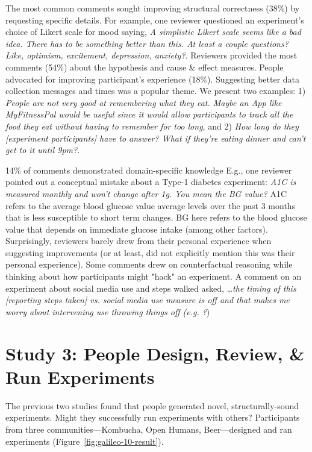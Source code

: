 The most common comments sought improving structural correctness (38\%) by requesting specific details. For example, one reviewer questioned an experiment's choice of Likert scale for mood saying, \textit{A simplistic Likert scale seems like a bad idea. There has to be something better than this. At least a couple questions? Like, optimism, excitement, depression, anxiety?}. Reviewers provided the most comments (54\%) about the hypothesis and cause \& effect measures. People advocated for improving participant's experience (18\%). Suggesting better data collection messages and times was a popular theme. We present two examples: 1) \textit{People are not very good at remembering what they eat. Maybe an App like MyFitnessPal would be useful since it would allow participants to track all the food they eat without having to remember for too long}, and 2) \textit{How long do they [experiment participants] have to answer? What if they're eating dinner and can't get to it until 9pm?}.

14\% of comments demonstrated domain-specific knowledge E.g., one reviewer pointed out a conceptual mistake about a Type-1 diabetes experiment: \textit{A1C is measured monthly and won't change after 1g. You mean the BG value?} A1C refers to the average blood glucose value average levels over the past 3 months that is less susceptible to short term changes. BG here refers to the blood glucose value that depends on immediate glucose intake (among other factors). Surprisingly, reviewers barely drew from their personal experience when suggesting improvements (or at least, did not explicitly mention this was their personal experience). Some comments drew on counterfactual reasoning while thinking about how participants might "hack" an experiment. A comment on an experiment about social media use and steps walked asked, \textit{…the timing of this [reporting steps taken] vs. social media use measure is off and that makes me worry about intervening use throwing things off (e.g. \textit{?}})

\section{Study 3: People Design, Review, \& Run Experiments}
The previous two studies found that people generated novel, structurally-sound experiments. Might they successfully run experiments with others? Participants from three communities---Kombucha, Open Humans, Beer---designed and ran experiments (Figure~\ref{fig:galileo-10-result}).  

